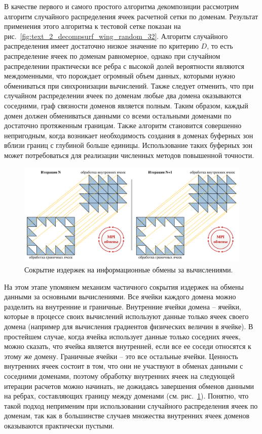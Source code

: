 В качестве первого и самого простого алгоритма декомпозиции рассмотрим алгоритм случайного распределения ячеек расчетной сетки по доменам.
Результат применения этого алгоритма к тестовой сетке показан на рис.~\ref{fig:text_2_decompsurf_wing_random_32}.
Алгоритм случайного распределения имеет достаточно низкое значение по критерию $D$, то есть распределение ячеек по доменам равномерное, однако при случайном распределении практически все ребра с высокой долей вероятности являются междоменными, что порождает огромный объем данных, которыми нужно обмениваться при синхронизации вычислений.
Также следует отменить, что при случайном распределении ячеек по доменам любые два домена оказываются соседними, граф связности доменов является полным.
Таким образом, каждый домен должен обмениваться данными со всеми остальными доменами по достаточно протяженным границам.
Также алгоритм становится совершенно непригодным, когда возникает необходимость создания в доменах буферных зон вблизи границ с глубиной больше единицы.
Использование таких буферных зон может потребоваться для реализации численных методов повышенной точности.

\begin{figure}[ht]
	\centering
	\includegraphics[width=1.0\textwidth]{./pics/text_2_decompsurf/mpi_border_inner.pdf}
	\caption{Сокрытие издержек на информационные обмены за вычислениями.}
	\label{fig:text_2_decompsurf_wing_border_inner}
\end{figure}

На этом этапе упомянем механизм частичного сокрытия издержек на обмены данными за основными вычислениями.
Все ячейки каждого домена можно разделить на внутренние и граничные.
Внутренние ячейки домена -- ячейки, которые в процессе своих вычислений используют данные только ячеек своего домена (например для вычисления градиентов физических величин в ячейке).
В простейшем случае, когда ячейка использует данные только соседних ячеек, можно сказать, что ячейка является внутренней, если все ее соседи относятся к этому же домену.
Граничные ячейки -- это все остальные ячейки.
Ценность внутренних ячеек состоит в том, что они не участвуют в обменах данными с соседними доменами, поэтому обработку внутренних ячеек на следующей итерации расчетов можно начинать, не дожидаясь завершения обменов данными на ребрах, составляющих границу между доменами (см. рис.~\ref{fig:text_2_decompsurf_wing_border_inner}).
Понятно, что такой подход неприменим при использовании случайного распределения ячеек по доменам, так как в большинстве случаев множества внутренних ячеек доменов оказываются практически пустыми.

